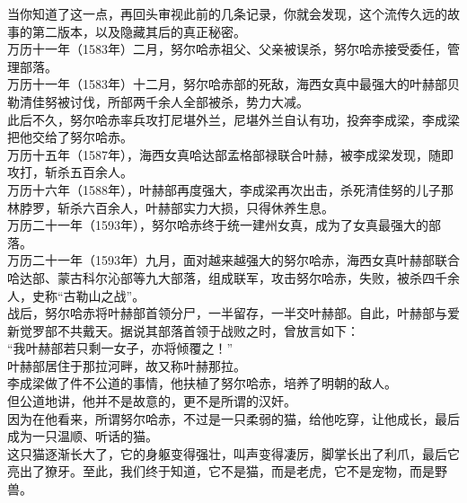 \begin{multicols}{\theparacolNo}
当你知道了这一点，再回头审视此前的几条记录，你就会发现，这个流传久远的故事的第二版本，以及隐藏其后的真正秘密。\\

万历十一年（1583年）二月，努尔哈赤祖父、父亲被误杀，努尔哈赤接受委任，管理部落。\\

万历十一年（1583年）十二月，努尔哈赤部的死敌，海西女真中最强大的叶赫部贝勒清佳努被讨伐，所部两千余人全部被杀，势力大减。\\

此后不久，努尔哈赤率兵攻打尼堪外兰，尼堪外兰自认有功，投奔李成梁，李成梁把他交给了努尔哈赤。\\

万历十五年（1587年），海西女真哈达部孟格部禄联合叶赫，被李成梁发现，随即攻打，斩杀五百余人。\\

万历十六年（1588年），叶赫部再度强大，李成梁再次出击，杀死清佳努的儿子那林脖罗，斩杀六百余人，叶赫部实力大损，只得休养生息。\\

万历二十一年（1593年），努尔哈赤终于统一建州女真，成为了女真最强大的部落。\\

万历二十一年（1593年）九月，面对越来越强大的努尔哈赤，海西女真叶赫部联合哈达部、蒙古科尔沁部等九大部落，组成联军，攻击努尔哈赤，失败，被杀四千余人，史称“古勒山之战”。\\

战后，努尔哈赤将叶赫部首领分尸，一半留存，一半交叶赫部。自此，叶赫部与爱新觉罗部不共戴天。据说其部落首领于战败之时，曾放言如下：\\

“我叶赫部若只剩一女子，亦将倾覆之！”\\

叶赫部居住于那拉河畔，故又称叶赫那拉。\\

李成梁做了件不公道的事情，他扶植了努尔哈赤，培养了明朝的敌人。\\

但公道地讲，他并不是故意的，更不是所谓的汉奸。\\

因为在他看来，所谓努尔哈赤，不过是一只柔弱的猫，给他吃穿，让他成长，最后成为一只温顺、听话的猫。\\

这只猫逐渐长大了，它的身躯变得强壮，叫声变得凄厉，脚掌长出了利爪，最后它亮出了獠牙。至此，我们终于知道，它不是猫，而是老虎，它不是宠物，而是野兽。\\


\end{multicols}
